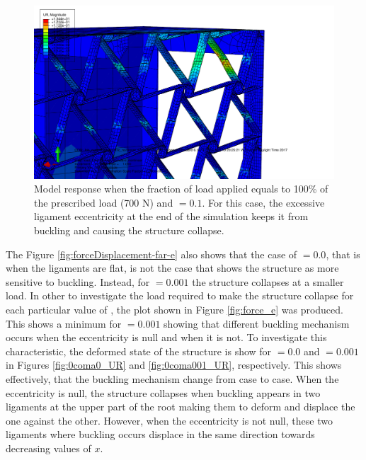       \begin{figure}[!htpb] %
        \centering
        \includegraphics[width=0.8 \textwidth]{../figures/result-sim/eccen/0coma1-700N}
        \caption[Model response when the fraction of load applied equals to 100\% of the prescribed load (700 N) and \chie$= 0.1$]{Model response when the fraction of load applied equals to 100\% of the prescribed load (700 N) and \chie$= 0.1$. For this case, the excessive ligament eccentricity at the end of the simulation keeps it from buckling and causing the structure collapse.}
        \label{fig:e0coma1-UR}
      \end{figure}

      The Figure \ref{fig:forceDisplacement-far-e} also shows that the case of \chie$= 0.0$, that is when the ligaments are flat, is not the case that shows the structure as more sensitive to buckling. Instead, for \chie$= 0.001$ the structure collapses at a smaller load. In other to investigate the load required to make the structure collapse for each particular value of \chit, the plot shown in Figure \ref{fig:force_e} was produced. This shows a minimum for \chie$= 0.001$ showing that different buckling mechanism occurs when the eccentricity is null and when it is not. To investigate this characteristic, the deformed state of the structure is show for \chie$= 0.0$ and \chie$= 0.001$ in Figures \ref{fig:0coma0_UR} and \ref{fig:0coma001_UR}, respectively. This shows effectively, that the buckling mechanism change from case to case. When the eccentricity is null, the structure collapses when buckling appears in two ligaments at the upper part of the root making them to deform and displace the one against the other. However, when the eccentricity is not null, these two ligaments where buckling occurs displace in the same direction towards decreasing values of $x$.

